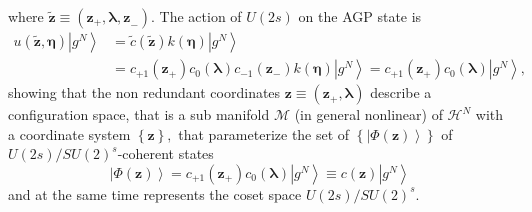 \documentclass[12pt,aps,amsfonts,amssymb,tightenlines]{revtex4}%
\begin{document}
where $\mathbf{\tilde{z}}\equiv\left(  \mathbf{z}_{+},\mathbf{\lambda,z}%
_{-}\right)  .$ The action of $U\left(  2s\right)  $ on the AGP state is
\begin{align}
u\left(  \mathbf{\tilde{z},\eta}\right)  \left\vert g^{N}\right\rangle  &
=\tilde{c}\left(  \mathbf{\tilde{z}}\right)  k\left(  \mathbf{\eta}\right)
\left\vert g^{N}\right\rangle \nonumber\\
&  =c_{+1}\left(  \mathbf{z}_{+}\right)  c_{0}\left(  \mathbf{\lambda}\right)
c_{-1}\left(  \mathbf{z}_{-}\right)  k\left(  \mathbf{\eta}\right)  \left\vert
g^{N}\right\rangle =c_{+1}\left(  \mathbf{z}_{+}\right)  c_{0}\left(
\mathbf{\lambda}\right)  \left\vert g^{N}\right\rangle ,
\end{align}
showing that the non redundant coordinates $\mathbf{z}\equiv\left(
\mathbf{z}_{+},\mathbf{\lambda}\right)  $ describe a configuration space, that
is a sub manifold $\mathcal{M}$ (in general nonlinear) of $\mathcal{H}^{N}$
with a coordinate system $\left\{  \mathbf{z}\right\}  ,$ that parameterize
the set of $\left\{  \left\vert \Phi\left(  \mathbf{z}\right)  \right\rangle
\right\}  $ of $U\left(  2s\right)  /SU\left(  2\right)  ^{s}$-coherent
states
\begin{equation}
\left\vert \Phi\left(  \mathbf{z}\right)  \right\rangle =c_{+1}\left(
\mathbf{z}_{+}\right)  c_{0}\left(  \mathbf{\lambda}\right)  \left\vert
g^{N}\right\rangle \equiv c\left(  \mathbf{z}\right)  \left\vert
g^{N}\right\rangle
\end{equation}
and at the same time represents the coset space $U\left(  2s\right)
/SU\left(  2\right)  ^{s}$.
\end{document}
